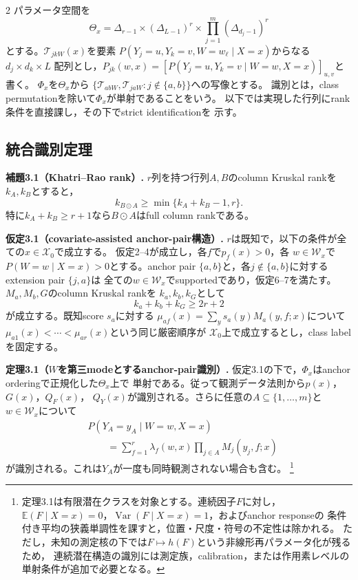 \documentclass[a4paper,10pt]{article}
\newcommand{\E}{\mathbb E}
\begin{document}
\begin{multicols}{2}
パラメータ空間を
\begin{equation}
\Theta_x=\Delta_{r-1}\times(\Delta_{L-1})^r
\times\prod_{j=1}^m(\Delta_{d_j-1})^r
\label{eq:latent-parameter-space}
\end{equation}
とする。$\mathcal T_{jkW}(x)$を要素
$P(Y_j=u,Y_k=v,W=w_\ell\mid X=x)$からなる$d_j\times d_k\times L$
配列とし，$P_{jk}(w,x)=[P(Y_j=u,Y_k=v\mid W=w,X=x)]_{u,v}$と書く。
$\Phi_x$を$\Theta_x$から
$\{\mathcal T_{abW},\mathcal T_{jaW}:j\notin\{a,b\}\}$への写像とする。
識別とは，class permutationを除いて$\Phi_x$が単射であることをいう。
以下では実現した行列にrank条件を直接課し，その下でstrict identificationを
示す。

\subsection{統合識別定理}

\noindent\textbf{補題3.1（Khatri--Rao rank）.}
$r$列を持つ行列$A,B$のcolumn Kruskal rankを$k_A,k_B$とすると，
\begin{equation}
k_{B\odot A}\ge\min\{k_A+k_B-1,r\}.
\label{eq:khatri-rao-rank-bound}
\end{equation}
特に$k_A+k_B\ge r+1$なら$B\odot A$はfull column rankである。

\noindent\textbf{仮定3.1（covariate-assisted anchor-pair構造）.}
$r$は既知で，以下の条件が全ての$x\in\mathcal X_0$で成立する。
仮定2--4が成立し，各$f$で$p_f(x)>0$，各
$w\in\mathcal W_x$で$P(W=w\mid X=x)>0$とする。anchor pair
$\{a,b\}$と，各$j\notin\{a,b\}$に対するextension pair $\{j,a\}$は
全ての$w\in\mathcal W_x$でsupportedであり，仮定6--7を満たす。
$M_a,M_b,G$のcolumn Kruskal rankを
$k_a,k_b,k_G$として
\begin{equation}
k_a+k_b+k_G\ge2r+2
\label{eq:anchor-kruskal-condition}
\end{equation}
が成立する。既知score $s_a$に対する
$\mu_{af}(x)=\sum_y s_a(y)M_a(y,f;x)$について
$\mu_{a1}(x)<\cdots<\mu_{ar}(x)$という同じ厳密順序が
$\mathcal X_0$上で成立するとし，class labelを固定する。

\noindent\textbf{定理3.1（$W$を第三modeとするanchor-pair識別）.}
仮定3.1の下で，$\Phi_x$はanchor orderingで正規化した$\Theta_x$上で
単射である。従って観測データ法則から$p(x)$，$G(x)$，$Q_F(x)$，
$Q_Y(x)$が識別される。さらに任意の$A\subseteq\{1,\ldots,m\}$と
$w\in\mathcal W_x$について
\begin{equation}
\begin{aligned}
&P(Y_A=y_A\mid W=w,X=x)\\
&\qquad=\sum_{f=1}^r\lambda_f(w,x)
 \prod_{j\in A}M_j(y_j,f;x)
\end{aligned}
\label{eq:latent-fulljoint-pair}
\end{equation}
が識別される。これは$Y_A$が一度も同時観測されない場合も含む。%
\footnote{定理3.1は有限潜在クラスを対象とする。連続因子$F$に対し，
$\E(F\mid X=x)=0$，$\operatorname{Var}(F\mid X=x)=1$，およびanchor responseの
条件付き平均の狭義単調性を課すと，位置・尺度・符号の不定性は除かれる。
ただし，未知の測定核の下では$F\mapsto h(F)$という非線形再パラメータ化が残るため，
連続潜在構造の識別には測定族，calibration，または作用素レベルの単射条件が追加で必要となる。}


\end{multicols}
\end{document}
